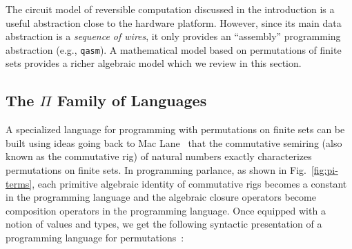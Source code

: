 The circuit model of reversible computation discussed in the introduction is a useful abstraction close to the hardware
platform. However, since its main data abstraction is a \emph{sequence of wires}, it only provides an ``assembly''
programming abstraction (e.g., \verb|qasm|). A mathematical model based on permutations of finite sets provides a richer
algebraic model which we review in this section.

\subsection{The $\Pi$ Family of Languages}
\label{sec:langRev-examples}
\label{examples}

A specialized language for programming with permutations on finite sets can be built using ideas going back to Mac
Lane~\cite{XXX} that the commutative semiring (also known as the commutative rig) of natural numbers exactly
characterizes permutations on finite sets. In programming parlance, as shown in Fig.~\ref{fig:pi-terms}, each primitive
algebraic identity of commutative rigs becomes a constant in the programming language and the algebraic closure
operators become composition operators in the programming language. Once equipped with a notion of values and types, we
get the following syntactic presentation of a programming language for
permutations~\cite{James:2012:IE:2103656.2103667,Carette2016}:


